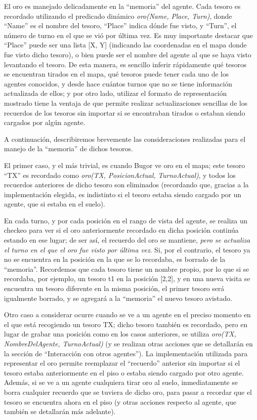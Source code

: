 \documentclass[a4paper,10pt,spanish]{article}
\begin{document}
		El oro es manejado delicadamente en la ``memoria'' del agente. Cada tesoro es recordado utilizando el predicado din\'amico \emph{oro(Name, Place, Turn)}, donde ``Name'' es el nombre del tesoro, ``Place'' indica d\'onde fue visto, y ``Turn'', el n\'umero de turno en el que se vi\'o por \'ultima vez. Es muy importante destacar que ``Place'' puede ser una lista [X, Y] (indicando las coordenadas en el mapa donde fue visto dicho tesoro), o bien puede ser el nombre del agente al que se haya visto levantando el tesoro. De esta manera, es sencillo inferir r\'apidamente qu\'e tesoros se encuentran tirados en el mapa, qu\'e tesoros puede tener cada uno de los agentes conocidos, y desde hace cu\'antos turnos que no se tiene informaci\'on actualizada de ellos; y por otro lado, utilizar el formato de representaci\'on mostrado tiene la ventaja de que permite realizar actualizaciones sencillas de los recuerdos de los tesoros sin importar si se encontraban tirados o estaban siendo cargados por alg\'un agente.
		
		A continuaci\'on, describiremos brevemente las consideraciones realizadas para el manejo de la ``memoria'' de dichos tesoros.
		
		El primer caso, y el m\'as trivial, es cuando Bugor ve oro en el mapa; este tesoro ``TX'' es recordado como \emph{oro(TX, PosicionActual, TurnoActual)}, y todos los recuerdos anteriores de dicho tesoro son eliminados (recordando que, gracias a la implementaci\'on elegida, es indistinto si el tesoro estaba siendo cargado por un agente, que si estaba en el suelo).
		
		En cada turno, y por cada posici\'on en el rango de vista del agente, se realiza un checkeo para ver si el oro anteriormente recordado en dicha posici\'on contin\'ua estando en ese lugar; de ser as\'i, el recuerdo del oro se mantiene, \emph{pero se actualiza el turno en el que el oro fue visto por \'ultima vez}. Si, por el contrario, el tesoro ya no se encuentra en la posici\'on en la que se lo recordaba, es borrado de la ``memoria''. Recordemos que cada tesoro tiene un nombre propio, por lo que si se recordaba, por ejemplo, un tesoro t1 en la posici\'on [2,2], y en una nueva visita se encuentra un tesoro diferente en la misma posici\'on, el primer tesoro ser\'a igualmente borrado, y se agregar\'a a la ``memoria'' el nuevo tesoro avistado.
		
		Otro caso a considerar ocurre cuando se ve a un agente en el preciso momento en el que est\'a recogiendo un tesoro TX; dicho tesoro tambi\'en es recordado, pero en lugar de grabar una posici\'on como en los casos anteriores, se utiliza \emph{oro(TX, NombreDelAgente, TurnoActual)} (y se realizan otras acciones que se detallar\'an en la secci\'on de ``Interacci\'on con otros agentes''). La implementaci\'on utilizada para representar el oro permite reemplazar el ``recuerdo'' anterior sin importar si el tesoro estaba anteriormente en el piso o estaba siendo cargado por otro agente. Adem\'as, si se ve a un agente cualquiera tirar oro al suelo, inmediatamente se borra cualquier recuerdo que se tuviera de dicho oro, para pasar a recordar que el tesoro se encuentra ahora en el piso (y otras acciones respecto al agente, que tambi\'en se detallar\'an m\'as adelante).
		
\end{document}
